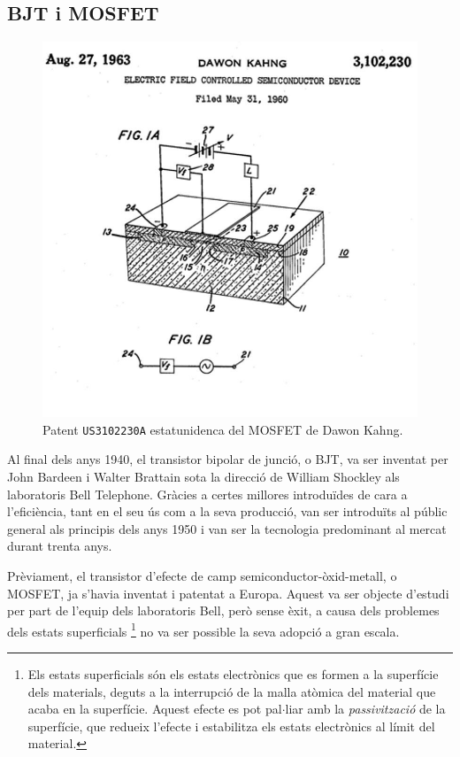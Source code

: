 \documentclass[11pt,a4paper]{article}
\begin{document}
\subsection{BJT i MOSFET}

\begin{figure}
    \centering
    \includegraphics[width=\linewidth]{images/patent kahang.jpg}
    \caption{Patent \texttt{US3102230A} estatunidenca del MOSFET de Dawon Kahng.}
\end{figure}
Al final dels anys 1940, el transistor bipolar de junció, o BJT, va ser inventat per John Bardeen i Walter Brattain sota la direcció de William Shockley als laboratoris Bell Telephone. Gràcies a certes millores introduïdes de cara a l'eficiència, tant en el seu ús com a la seva producció, van ser introduïts al públic general als principis dels anys 1950 i van ser la tecnologia predominant al mercat durant trenta anys.


Prèviament, el transistor d'efecte de camp semiconductor-òxid-metall, o MOSFET, ja s'havia inventat i patentat a Europa. Aquest va ser objecte d'estudi per part de l'equip dels laboratoris Bell, però sense èxit, a causa dels problemes dels estats superficials \footnote{Els estats superficials són els estats electrònics que es formen a la superfície dels materials, deguts a la interrupció de la malla atòmica del material que acaba en la superfície. Aquest efecte es pot pal$\cdot$liar amb la \textit{passivització} de la superfície, que redueix l'efecte i estabilitza els estats electrònics al límit del material.} no va ser possible la seva adopció a gran escala.
\end{document}
